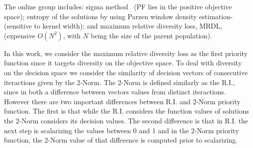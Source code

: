 The online group includes: sigma method~\cite{mostaghim2003strategies}  (PF lies in the positive objective space); entropy of the solutions by using Parzen window density estimation-\cite{tan2008evolutionary} (sensitive to kernel width); and maximum relative diversity loss, MRDL, ~\cite{gee2015online} (expensive $O(N^2)$, with $N$ being the size of the parent population).

In this work, we consider the maximum relative diversity loss as the first priority function since it targets diversity on the objective space. To deal with diversity on the decision space we consider the similarity of decision vectors of consecutive iteractions given by the 2-Norm. The 2-Norm is defined similarly as the R.I., since in both a difference between vectors values from distinct iteractions. However there are two important differences between R.I. and 2-Norm priority function. The first is that while the R.I. considers the function values of solutions the 2-Norm considers its decision values. The second difference is that in R.I. the next step is scalarizing the values between 0 and 1 and in the 2-Norm priority function, the 2-Norm value of that difference is computed prior to scalarizing. 








